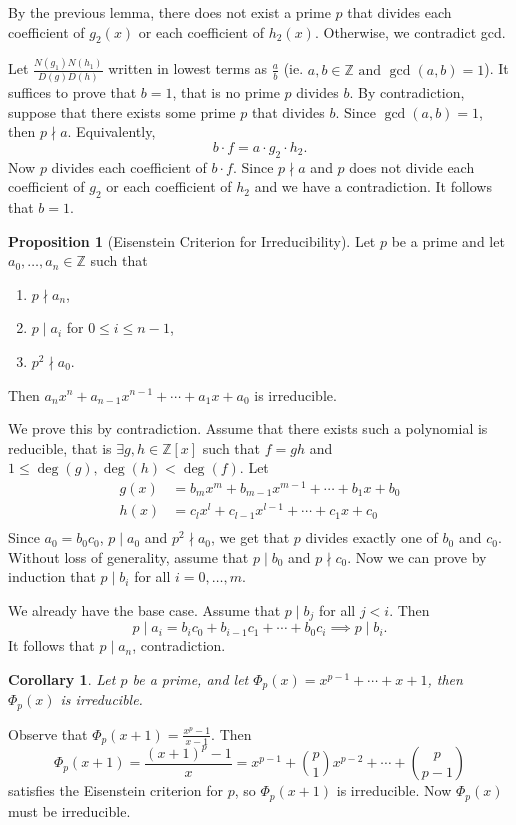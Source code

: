 \documentclass[11pt]{article}
\newtheorem{cor}{Corollary}[thm]
\theoremstyle{definition}
\newtheorem{prop}{Proposition}[section]
\newcommand{\rng}[2]{#1,\dots,#2}
\newcommand{\srng}[3]{#1_#2,\dots,#1_#3}
\newcommand{\et}[0]{\text{ and }}
\newcommand{\ZZ}{\mathbb{Z}}
\begin{document}
	By the previous lemma, there does not exist a prime $p$ that divides each coefficient of $g_2(x)$ or each coefficient of $h_2(x)$.
	Otherwise, we contradict gcd. 

	Let $\frac{N(g_1)N(h_1)}{D(g)D(h)}$ written in lowest terms as $\frac{a}{b}$ (ie. $a,b\in\ZZ \et \gcd(a,b)=1$). 
	It suffices to prove that $b=1$, that is no prime $p$ divides $b$. 
	By contradiction, suppose that there exists some prime $p$ that divides $b$. 
	Since $\gcd(a,b)=1$, then $p \nmid a$. 
	Equivalently, 
	$$ b\cdot f = a\cdot g_2 \cdot h_2 . $$
	Now $p$ divides each coefficient of $b\cdot f$. 
	Since $p\nmid a$ and $p$ does not divide each coefficient of $g_2$ or each coefficient of $h_2$ and we have a contradiction. 
	It follows that $b = 1$. 
\qedhere

\begin{prop}[Eisenstein Criterion for Irreducibility]
	Let $p$ be a prime and let $\srng{a}{0}{n}\in\ZZ$ such that 
	\begin{enumerate}
		\item $p \nmid a_n$,
		\item $p \mid a_i$ for $0\le i \le n-1$,
		\item $p^2 \nmid a_0$. 
	\end{enumerate}
	Then $a_n x^n + a_{n-1} x^{n-1} + \cdots + a_1 x + a_0$ is irreducible.
\end{prop}


\proof
	We prove this by contradiction.
	Assume that there exists such a polynomial is reducible, that is $\exists g,h\in\ZZ[x]$ such that $f=gh$ and $1\le\deg(g),\deg(h)<\deg(f)$. 
	Let 
	\begin{align*}
		g(x) &= b_m x^m + b_{m-1} x^{m-1} + \cdots + b_1 x + b_0 \\
		h(x) &= c_l x^l + c_{l-1} x^{l-1} + \cdots + c_1 x + c_0 \\
	\end{align*}
	Since $a_0 = b_0 c_0$, $p\mid a_0$ and $p^2\nmid a_0$, we get that $p$ divides exactly one of $b_0$ and $c_0$.
	Without loss of generality, assume that $p\mid b_0$ and $p\nmid c_0$. 
	Now we can prove by induction that $p\mid b_i$ for all $i = \rng{0}{m}$. 

	We already have the base case. 
	Assume that $p\mid b_j$ for all $j < i$. 
	Then 
	$$ p \mid a_i = b_i c_0 + b_{i-1} c_1 + \cdots + b_0 c_i \implies p \mid b_i . $$
	It follows that $p \mid a_n$, contradiction.
\qedhere
\begin{cor}
	Let $p$ be a prime, and let $\Phi_p(x) = x^{p-1} + \cdots + x + 1$, then $\Phi_p(x)$ is irreducible. 
\end{cor}
\proof
	Observe that $\Phi_p(x+1) = \frac{x^p-1}{x-1}$. Then
	$$ \Phi_p(x+1) = \frac{(x+1)^p-1}{x} = x^{p-1} + \binom{p}{1}x^{p-2} + \cdots + \binom{p}{p-1} $$
	satisfies the Eisenstein criterion for $p$, so $\Phi_p(x+1)$ is irreducible. 
	Now $\Phi_p(x)$ must be irreducible.
\end{document}
